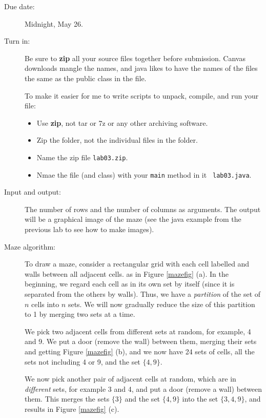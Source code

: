 \documentclass{article}
\newcommand{\set}[1]{\ensuremath{\{#1\}}}
\begin{document}
\begin{description}

\item[Due date:] Midnight, May 26.

\item[Turn in:] Be sure to {\bf zip} all your source files together
  before submission.  Canvas downloads mangle the names, and java
  likes to have the names of the files the same as the public class in
  the file.

  To make
  it easier for me to write scripts to unpack, compile, and run your
  file:
  \begin{itemize}
    \item
      Use {\bf zip}, not tar or 7z or any other archiving software.
      \item Zip the folder, not the individual  files in the folder.
      \item Name the zip file {\tt lab03.zip}.
\item
  Nmae the file (and class) with your {\tt main} method in it {\tt
    lab03.java}. 
  \end{itemize}

\item[Input and output:]  The number of rows and the number of
  columns as arguments.  The output will be a graphical image of the
  maze (see the java example from the previous lab to see how to make
  images). 
  
\item[Maze algorithm:] To draw a maze, consider a rectangular grid
  with each cell labelled and walls between all adjacent cells. as in
  Figure \ref{mazefig} (a).  In the beginning, we regard each cell as
  in its own set by itself (since it is separated from the others by
  walls).  Thus, we have a {\em partition} of the set of $n$ cells
  into $n$ sets.  We will now gradually reduce the size of this
  partition to 1 by merging two sets at a time.

  We pick two adjacent cells from different sets at random, for
  example, 4 and 9.  We put a door (remove the wall) between them,
  merging their sets and getting Figure \ref{mazefig} (b), and we now
  have 24 sets of cells, all the sets not including 4 or 9, and the
  set \set{4,9}.

  We now pick another pair of adjacent cells at random, which are in
  {\em different} sets, for example 3 and 4, and put a door (remove a
  wall) between them.  This merges the sets \set{3} and the set
  \set{4,9} into the set \set{3,4,9}, and results in Figure
  \ref{mazefig} (c).



\end{description}
\end{document}
